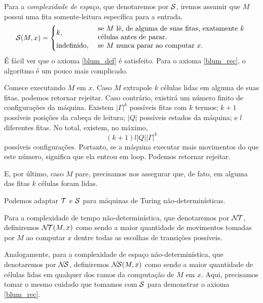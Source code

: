 \begin{example}
    \label{complexidade_espaco}
    Para a \emph{complexidade de espaço},
    que denotaremos por ${\mathcal{S}}$,
    iremos assumir que $M$ possui uma fita somente-leitura
    específica para a entrada.
    \begin{equation*}
        \PhiDS(M, x) = \begin{cases}
            k, & \text{
                \parbox{0.6\textwidth}{%
                    se $M$ lê, de alguma de suas fitas,
                    exatamente $k$ células
                    antes de parar.
                }
            } \\
            \text{indefinido}, & \text{
                \parbox{0.6\textwidth}{
                    se $M$ nunca parar ao computar $x$.
                }
            }
        \end{cases}
    \end{equation*}
    É fácil ver que o axioma \ref{blum_def} é satisfeito.
    Para o axioma \ref{blum_rec},
    o algoritmo é um pouco mais complicado.

    Comece executando $M$ em $x$.
    Caso $M$ extrapole $k$ células lidas
    em alguma de suas fitas,
    podemos retornar rejeitar.
    Caso contrário,
    existirá um número finito de configurações da máquina.
    Existem $|\Gamma|^k$ possíveis fitas com $k$ termos;
    $k+1$ possíveis posições da cabeça de leitura;
    $|Q|$ possíveis estados da máquina;
    e $l$ diferentes fitas.
    No total, existem, no máximo,
    \begin{equation*}
        (k+1) l |Q||\Gamma|^k
    \end{equation*}
    possíveis configurações.
    Portanto, se a máquina executar
    mais movimentos do que este número,
    significa que ela entrou em loop.
    Podemos retornar rejeitar.

    E, por último,
    caso $M$ pare,
    precisamos nos assegurar que,
    de fato,
    em alguma das fitas $k$ células foram lidas.
\end{example}

\begin{example}
    Podemos adaptar ${\mathcal{T}}$ e ${\mathcal{S}}$
    para máquinas de Turing não\hyp{}determinísticas.

    Para a complexidade de tempo não-determinística,
    que denotaremos por ${\mathcal{N\!T}}$,
    definiremos ${\mathcal{N\!T}}(M, x)$
    como sendo a maior quantidade de movimentos
    tomadas por $M$ ao computar $x$
    dentre todas as escolhas de transições possíveis.

    Analogamente,
    para a complexidade de espaço não-determinística,
    que denotaremos por ${\mathcal{N\!S}}$,
    definiremos ${\mathcal{N\!S}}(M, x)$
    como sendo a maior quantidade de células lidas
    em qualquer dos ramos da computação de $M$ em $x$.
    Aqui, precisamos tomar o mesmo cuidado que tomamos
    com ${\mathcal{S}}$ para demonstrar o axioma \ref{blum_rec}.
\end{example}

